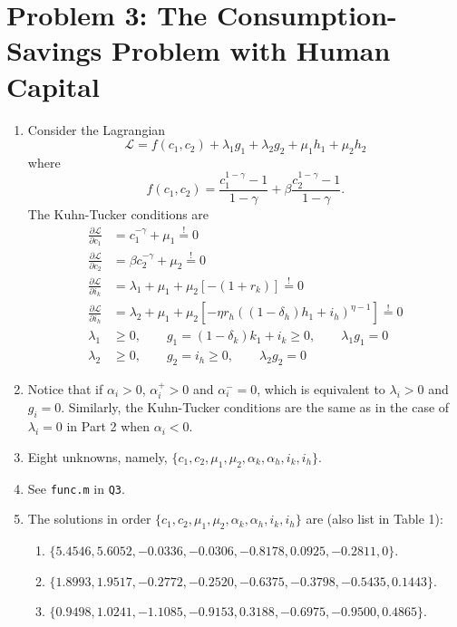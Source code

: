 \section{Problem 3: The Consumption-Savings Problem with Human Capital}
\begin{enumerate}
\item 
Consider the Lagrangian
\begin{equation*}
	\mathcal L=f(c_1,c_2)+\lambda_1g_1+\lambda_2g_2+\mu_1h_1+\mu_2h_2
\end{equation*}
where
\begin{equation*}
	f(c_1,c_2)=\frac{c_1^{1-\gamma}-1}{1-\gamma}+\beta\frac{c_2^{1-\gamma}-1}{1-\gamma}.
\end{equation*}
The Kuhn-Tucker conditions are
\begin{align*}
	\frac{\partial\mathcal L}{\partial c_1}&=c_1^{-\gamma}+\mu_1\overset{!}{=}0\\
	\frac{\partial\mathcal L}{\partial c_2}&=\beta c_2^{-\gamma}+\mu_2\overset{!}{=}0\\
	\frac{\partial\mathcal L}{\partial i_k}&=\lambda_1+\mu_1+\mu_2[-(1+r_k)]\overset{!}{=}0\\
	\frac{\partial\mathcal L}{\partial i_h}&=\lambda_2+\mu_1+\mu_2[-\eta r_h((1-\delta_h)h_1+i_h)^{\eta-1}]\overset{!}{=}0\\
	\lambda_1&\ge0,\qquad g_1=(1-\delta_k)k_1+i_k\ge0,\qquad\lambda_1 g_1=0\\
	\lambda_2&\ge0,\qquad g_2=i_h\ge0,\qquad\lambda_2g_2=0
\end{align*}

\item
Notice that if $\alpha_i>0$, $\alpha_i^+>0$ and $\alpha_i^-=0$, which is equivalent to $\lambda_i>0$ and $g_i=0$. Similarly, the Kuhn-Tucker conditions are the same as in the case of $\lambda_i=0$ in Part 2 when $\alpha_i<0$.

\item
Eight unknowns, namely, $\{c_1,c_2,\mu_1,\mu_2,\alpha_k,\alpha_h,i_k,i_h\}$.

\item
See \texttt{func.m} in \texttt{Q3}.

\item 
The solutions in order $\{c_1,c_2,\mu_1,\mu_2,\alpha_k,\alpha_h,i_k,i_h\}$ are (also list in Table 1):
\begin{enumerate}
\item
$\{5.4546,5.6052,-0.0336,-0.0306,-0.8178,0.0925,-0.2811,0\}$.
\item
$\{1.8993,1.9517,-0.2772,-0.2520,-0.6375,-0.3798,-0.5435,0.1443\}$.
\item
$\{0.9498,1.0241,-1.1085,-0.9153,0.3188,-0.6975,-0.9500,0.4865\}$.
\end{enumerate}


\end{enumerate}
